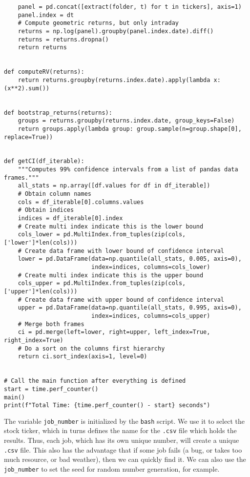 \documentclass[12pt, a4paper]{article}
\begin{document}
\begin{lstlisting}
    panel = pd.concat([extract(folder, t) for t in tickers], axis=1)
    panel.index = dt
    # Compute geometric returns, but only intraday
    returns = np.log(panel).groupby(panel.index.date).diff()
    returns = returns.dropna()
    return returns


def computeRV(returns):
    return returns.groupby(returns.index.date).apply(lambda x: (x**2).sum())


def bootstrap_returns(returns):
    groups = returns.groupby(returns.index.date, group_keys=False)
    return groups.apply(lambda group: group.sample(n=group.shape[0], replace=True))


def getCI(df_iterable):
    """Computes 99% confidence intervals from a list of pandas data frames."""
    all_stats = np.array([df.values for df in df_iterable])
    # Obtain column names
    cols = df_iterable[0].columns.values
    # Obtain indices
    indices = df_iterable[0].index
    # Create multi index indicate this is the lower bound
    cols_lower = pd.MultiIndex.from_tuples(zip(cols, ['lower']*len(cols)))
    # Create data frame with lower bound of confidence interval
    lower = pd.DataFrame(data=np.quantile(all_stats, 0.005, axis=0),
                         index=indices, columns=cols_lower)
    # Create multi index indicate this is the upper bound
    cols_upper = pd.MultiIndex.from_tuples(zip(cols, ['upper']*len(cols)))
    # Create data frame with upper bound of confidence interval
    upper = pd.DataFrame(data=np.quantile(all_stats, 0.995, axis=0),
                         index=indices, columns=cols_upper)
    # Merge both frames
    ci = pd.merge(left=lower, right=upper, left_index=True, right_index=True)
    # Do a sort on the columns first hierarchy
    return ci.sort_index(axis=1, level=0)


# Call the main function after everything is defined
start = time.perf_counter()
main()
print(f"Total Time: {time.perf_counter() - start} seconds")
\end{lstlisting}

The variable \texttt{job\_number} is initialized by the \texttt{bash} script.
We use it to select the stock ticker, which in turns defines the name for the \texttt{.csv} file which holds the results.
Thus, each job, which has its own unique number, will create a unique \texttt{.csv} file.
This also has the advantage that if some job fails (a bug, or takes too much resource, or bad weather), then we can quickly find it.
We can also use the \texttt{job\_number} to set the seed for random number generation, for example.
\end{document}
